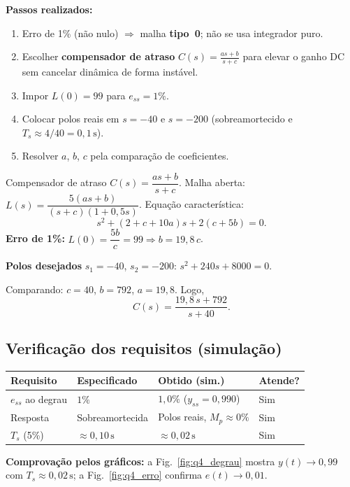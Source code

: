 \documentclass[11pt,a4paper]{article}
\begin{document}
\textbf{Passos realizados:}
\begin{enumerate}[leftmargin=*]
  \item Erro de 1\% (não nulo) $\Rightarrow$ malha \textbf{tipo~0}; não se
        usa integrador puro.
  \item Escolher \textbf{compensador de atraso} $C(s)=\frac{as+b}{s+c}$ para
        elevar o ganho DC sem cancelar dinâmica de forma instável.
  \item Impor $L(0)=99$ para $e_{ss}=1\%$.
  \item Colocar polos reais em $s=-40$ e $s=-200$ (sobreamortecido e
        $T_s\approx 4/40=0{,}1\,\mathrm{s}$).
  \item Resolver $a$, $b$, $c$ pela comparação de coeficientes.
\end{enumerate}

Compensador de atraso $C(s)=\dfrac{as+b}{s+c}$. Malha aberta:
$L(s)=\dfrac{5(as+b)}{(s+c)(1+0{,}5s)}$. Equação característica:
\[
  s^2+(2+c+10a)s+2(c+5b)=0.
\]
\textbf{Erro de 1\%:} $L(0)=\dfrac{5b}{c}=99\Rightarrow b=19{,}8\,c$.

\textbf{Polos desejados} $s_1=-40$, $s_2=-200$: $s^2+240s+8000=0$.

Comparando: $c=40$, $b=792$, $a=19{,}8$. Logo,
\[
  C(s)=\frac{19{,}8\,s+792}{s+40}.
\]

\subsection*{Verificação dos requisitos (simulação)}

\begin{center}
\small
\begin{tabular}{@{}llll@{}}
  \toprule
  Requisito & Especificado & Obtido (sim.) & Atende? \\
  \midrule
  $e_{ss}$ ao degrau & $1\%$ & $1{,}0\%$ ($y_{ss}=0{,}990$) & Sim \\
  Resposta & Sobreamortecida & Polos reais, $M_p\approx 0\%$ & Sim \\
  $T_s$ (5\%) & $\approx 0{,}10\,\mathrm{s}$ & $\approx 0{,}02\,\mathrm{s}$ & Sim \\
  \bottomrule
\end{tabular}
\end{center}

\textbf{Comprovação pelos gráficos:} a Fig.~\ref{fig:q4_degrau} mostra
$y(t)\to 0{,}99$ com $T_s\approx 0{,}02\,\mathrm{s}$; a
Fig.~\ref{fig:q4_erro} confirma $e(t)\to 0{,}01$.
\end{document}
